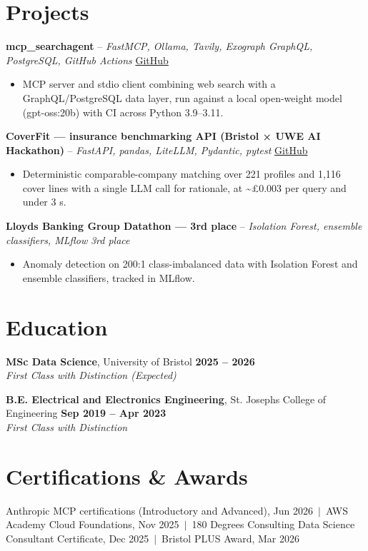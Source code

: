 \documentclass[a4paper,11pt]{article}
\begin{document}
\section{Projects}
\noindent\textbf{mcp\_searchagent} -- \textit{FastMCP, Ollama, Tavily, Exograph GraphQL, PostgreSQL, GitHub Actions} \hfill \href{https://github.com/Thiruvel-AP/mcp_searchagent}{GitHub}
\begin{itemize}
  \item MCP server and stdio client combining web search with a GraphQL/PostgreSQL data layer, run against a local open-weight model (gpt-oss:20b) with CI across Python 3.9–3.11.
\end{itemize}
\vspace{3pt}
\noindent\textbf{CoverFit — insurance benchmarking API (Bristol × UWE AI Hackathon)} -- \textit{FastAPI, pandas, LiteLLM, Pydantic, pytest} \hfill \href{https://github.com/Thiruvel-AP/AIHackathon-Phoenix}{GitHub}
\begin{itemize}
  \item Deterministic comparable-company matching over 221 profiles and 1,116 cover lines with a single LLM call for rationale, at \textasciitilde{}£0.003 per query and under 3 s.
\end{itemize}
\vspace{3pt}
\noindent\textbf{Lloyd\textquotesingle{}s Banking Group Datathon — 3rd place} -- \textit{Isolation Forest, ensemble classifiers, MLflow} \hfill \textit{3rd place}
\begin{itemize}
  \item Anomaly detection on 200:1 class-imbalanced data with Isolation Forest and ensemble classifiers, tracked in MLflow.
\end{itemize}

\section{Education}
\textbf{MSc Data Science}, University of Bristol \hfill \textbf{2025 – 2026}\\ \textit{First Class with Distinction (Expected)}\par
\vspace{3pt}
\textbf{B.E. Electrical and Electronics Engineering}, St. Joseph\textquotesingle{}s College of Engineering \hfill \textbf{Sep 2019 – Apr 2023}\\ \textit{First Class with Distinction}\par

\section{Certifications \& Awards}
Anthropic MCP certifications (Introductory and Advanced), Jun 2026 \,$|$\, AWS Academy Cloud Foundations, Nov 2025 \,$|$\, 180 Degrees Consulting Data Science Consultant Certificate, Dec 2025 \,$|$\, Bristol PLUS Award, Mar 2026
\end{document}
